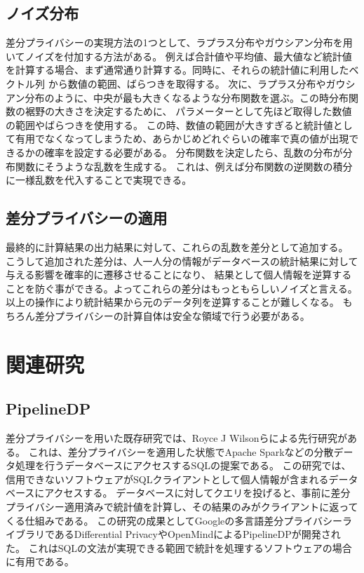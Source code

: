 \documentclass[a4paper,11pt]{jreport}
\begin{document}
\subsection{ノイズ分布}
差分プライバシーの実現方法の1つとして、ラプラス分布やガウシアン分布を用いてノイズを付加する方法がある。
例えば合計値や平均値、最大値など統計値を計算する場合、まず通常通り計算する。同時に、それらの統計値に利用したベクトル列
から数値の範囲、ばらつきを取得する。
次に、ラプラス分布やガウシアン分布のように、中央が最も大きくなるような分布関数を選ぶ。この時分布関数の裾野の大きさを決定するために、
パラメーターとして先ほど取得した数値の範囲やばらつきを使用する。
この時、数値の範囲が大きすぎると統計値として有用でなくなってしまうため、あらかじめどれぐらいの確率で真の値が出現できるかの確率を設定する必要がある。
分布関数を決定したら、乱数の分布が分布関数にそうような乱数を生成する。
これは、例えば分布関数の逆関数の積分に一様乱数を代入することで実現できる。\cite{rand}

\subsection{差分プライバシーの適用}
最終的に計算結果の出力結果に対して、これらの乱数を差分として追加する。
こうして追加された差分は、人一人分の情報がデータベースの統計結果に対して与える影響を確率的に遷移させることになり、
結果として個人情報を逆算することを防ぐ事ができる。よってこれらの差分はもっともらしいノイズと言える。
以上の操作により統計結果から元のデータ列を逆算することが難しくなる。
もちろん差分プライバシーの計算自体は安全な領域で行う必要がある。

\section{関連研究}

\subsection{PipelineDP}

差分プライバシーを用いた既存研究では、Royce J Wilsonらによる先行研究\cite{dpsql}がある。
これは、差分プライバシーを適用した状態でApache Spark\cite{apache}などの分散データ処理を行うデータベースにアクセスするSQLの提案である。
この研究では、信用できないソフトウェアがSQLクライアントとして個人情報が含まれるデータベースにアクセスする。
データベースに対してクエリを投げると、事前に差分プライバシー適用済みで統計値を計算し、その結果のみがクライアントに返ってくる仕組みである。
この研究の成果としてGoogleの多言語差分プライバシーライブラリであるDifferential Privacy\cite{googledp}やOpenMindによるPipelineDP\cite{openmind}が開発された。
これはSQLの文法が実現できる範囲で統計を処理するソフトウェアの場合に有用である。
\end{document}
